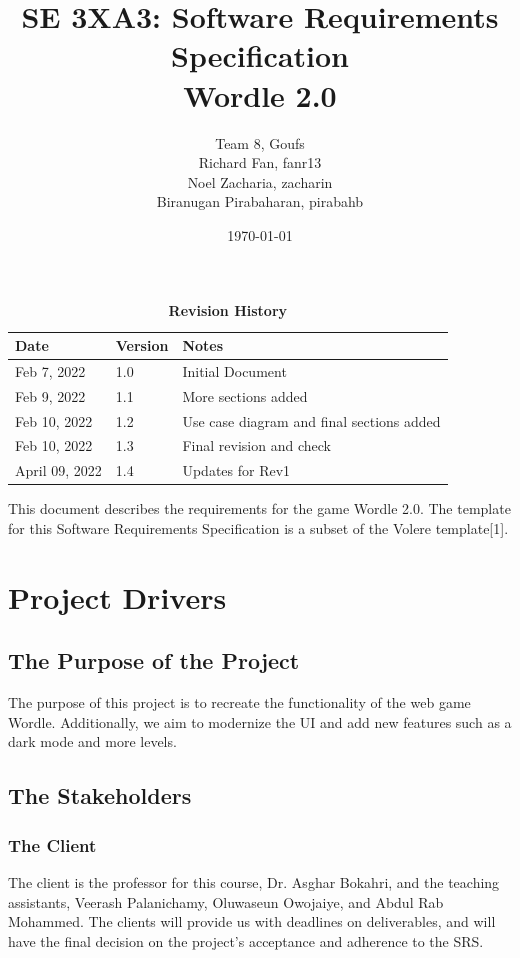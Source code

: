 \documentclass[12pt, titlepage]{article}
\title{SE 3XA3: Software Requirements Specification\\Wordle 2.0}
\author{Team 8, Goufs
	\\ Richard Fan, fanr13
	\\ Noel Zacharia, zacharin
	\\ Biranugan Pirabaharan, pirabahb
}
\date{\today}
\begin{document}
	
	\maketitle
	
	\tableofcontents
	\listoftables
	\listoffigures
	
	\begin{table}[bp]
		\caption{\bf Revision History}
		\begin{tabularx}{\textwidth}{p{3cm}p{2cm}X}
			\toprule {\bf Date} & {\bf Version} & {\bf Notes}\\
			\midrule
			Feb 7, 2022  & 1.0 & Initial Document\\
			Feb 9, 2022 & 1.1 & More sections added\\
			Feb 10, 2022 & 1.2 & Use case diagram and final sections added\\
			Feb 10, 2022 & 1.3 & Final revision and check \\
			April 09, 2022 & 1.4 & Updates for Rev1\\
			\bottomrule
			
		\end{tabularx}
	\end{table}
	
	\newpage
	
	This document describes the requirements for the game Wordle 2.0. The 
	template 
	for this Software Requirements Specification is a subset of the Volere 
	template[1].
	
	
	\section{Project Drivers}
	
	\subsection{The Purpose of the Project}
	The purpose of this project is to recreate the functionality of the web 
	game Wordle. Additionally, we aim to modernize the UI and add new features 
	such as a dark mode and more levels.
	\subsection{The Stakeholders}
	
	\subsubsection{The Client}
	The client is the professor for this course, Dr. Asghar Bokahri, and the 
	teaching assistants, Veerash Palanichamy, Oluwaseun Owojaiye, and Abdul Rab 
	Mohammed. The clients will provide us with deadlines on deliverables, and 
	will 
	have the final decision on the project's acceptance and adherence to the 
	SRS. 
	
\end{document}

